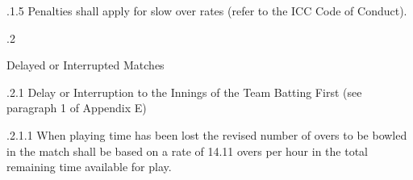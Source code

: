 \documentclass[12pt]{article}
\begin{document}
\vspace{\baselineskip}
\begin{adjustwidth}{0.49in}{0.0in}
{\fontsize{9pt}{10.8pt}.1.5 \tabto{1.17in} Penalties shall apply for slow over rates (refer to the ICC Code of Conduct).\par}\par

\end{adjustwidth}


\vspace{\baselineskip}

\vspace{\baselineskip}

\vspace{\baselineskip}

\vspace{\baselineskip}
\begin{Center}
{\fontsize{8pt}{9.6pt}\par}
\end{Center}\par


\vspace{\baselineskip}
{\fontsize{9pt}{10.8pt}.2 \tabto{0.49in} {\fontsize{8pt}{9.6pt}\selectfont Delayed or Interrupted Matches\par}\par}\par


\vspace{\baselineskip}
\begin{adjustwidth}{0.49in}{0.0in}
{\fontsize{9pt}{10.8pt}.2.1 \tabto{1.17in} Delay or Interruption to the Innings of the Team Batting First (see paragraph 1 of Appendix E)\par}\par

\end{adjustwidth}


\vspace{\baselineskip}
\begin{adjustwidth}{1.97in}{0.03in}
\begin{justify}
{\fontsize{9pt}{10.8pt}.2.1.1 \tabto{1.96in} When playing time has been lost the revised number of overs to be bowled in the match shall be based on a rate of 14.11 overs per hour in the total remaining time available for play.\par}
\end{justify}\par

\end{adjustwidth}
\end{document}
